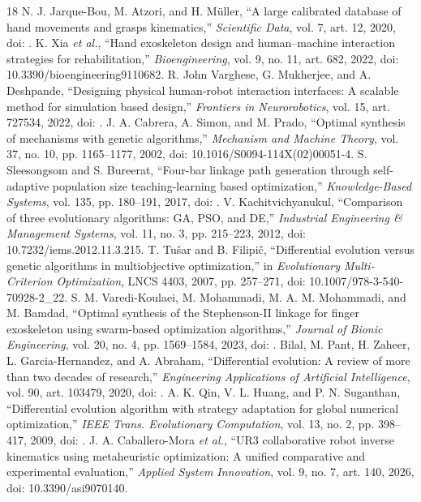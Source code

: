 \begin{thebibliography}{18}
 N. J. Jarque-Bou, M. Atzori, and H. Müller, ``A large calibrated database of hand movements and grasps kinematics,'' \emph{Scientific Data}, vol. 7, art. 12, 2020, doi: .
 K. Xia \emph{et al.}, ``Hand exoskeleton design and human--machine interaction strategies for rehabilitation,'' \emph{Bioengineering}, vol. 9, no. 11, art. 682, 2022, doi: 10.3390/bioengineering9110682.
 R. John Varghese, G. Mukherjee, and A. Deshpande, ``Designing physical human-robot interaction interfaces: A scalable method for simulation based design,'' \emph{Frontiers in Neurorobotics}, vol. 15, art. 727534, 2022, doi: .
 J. A. Cabrera, A. Simon, and M. Prado, ``Optimal synthesis of mechanisms with genetic algorithms,'' \emph{Mechanism and Machine Theory}, vol. 37, no. 10, pp. 1165--1177, 2002, doi: 10.1016/S0094-114X(02)00051-4.
 S. Sleesongsom and S. Bureerat, ``Four-bar linkage path generation through self-adaptive population size teaching-learning based optimization,'' \emph{Knowledge-Based Systems}, vol. 135, pp. 180--191, 2017, doi: .
 V. Kachitvichyanukul, ``Comparison of three evolutionary algorithms: GA, PSO, and DE,'' \emph{Industrial Engineering \& Management Systems}, vol. 11, no. 3, pp. 215--223, 2012, doi: 10.7232/iems.2012.11.3.215.
 T. Tušar and B. Filipič, ``Differential evolution versus genetic algorithms in multiobjective optimization,'' in \emph{Evolutionary Multi-Criterion Optimization}, LNCS 4403, 2007, pp. 257--271, doi: 10.1007/978-3-540-70928-2\_22.
 S. M. Varedi-Koulaei, M. Mohammadi, M. A. M. Mohammadi, and M. Bamdad, ``Optimal synthesis of the Stephenson-II linkage for finger exoskeleton using swarm-based optimization algorithms,'' \emph{Journal of Bionic Engineering}, vol. 20, no. 4, pp. 1569--1584, 2023, doi: .
 Bilal, M. Pant, H. Zaheer, L. Garcia-Hernandez, and A. Abraham, ``Differential evolution: A review of more than two decades of research,'' \emph{Engineering Applications of Artificial Intelligence}, vol. 90, art. 103479, 2020, doi: .
 A. K. Qin, V. L. Huang, and P. N. Suganthan, ``Differential evolution algorithm with strategy adaptation for global numerical optimization,'' \emph{IEEE Trans. Evolutionary Computation}, vol. 13, no. 2, pp. 398--417, 2009, doi: .
 J. A. Caballero-Mora \emph{et al.}, ``UR3 collaborative robot inverse kinematics using metaheuristic optimization: A unified comparative and experimental evaluation,'' \emph{Applied System Innovation}, vol. 9, no. 7, art. 140, 2026, doi: 10.3390/asi9070140.

\end{thebibliography}

